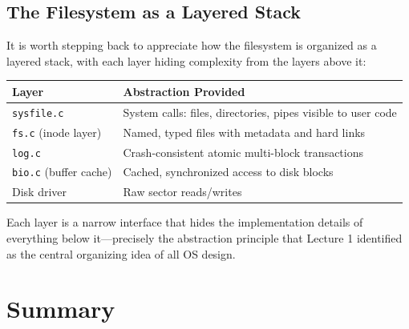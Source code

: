 \documentclass[11pt]{article}
\begin{document}
\subsection{The Filesystem as a Layered Stack}

It is worth stepping back to appreciate how the filesystem is organized as a layered stack, with each layer hiding complexity from the layers above it:

\begin{center}
\begin{tabular}{ll}
\toprule
\textbf{Layer} & \textbf{Abstraction Provided} \\
\midrule
\texttt{sysfile.c} & System calls: files, directories, pipes visible to user code \\
\texttt{fs.c} (inode layer) & Named, typed files with metadata and hard links \\
\texttt{log.c} & Crash-consistent atomic multi-block transactions \\
\texttt{bio.c} (buffer cache) & Cached, synchronized access to disk blocks \\
Disk driver & Raw sector reads/writes \\
\bottomrule
\end{tabular}
\end{center}

Each layer is a narrow interface that hides the implementation details of everything below it---precisely the abstraction principle that Lecture 1 identified as the central organizing idea of all OS design.

\section{Summary}
\end{document}
